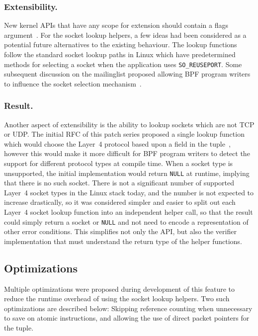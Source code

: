 \documentclass[10pt,sigconf,authorversion]{lpc}
\begin{document}
\subsubsection{Extensibility.}

New kernel APIs that have any scope for extension should contain a flags
argument~\cite{syscall-flags}. For the socket lookup helpers, a few ideas had
been considered as a potential future alternatives to the existing behaviour.
The lookup functions follow the standard socket lookup paths in Linux which
have predetermined methods for selecting a socket when the application uses
\verb+SO_REUSEPORT+. Some subsequent discussion on the mailinglist proposed
allowing BPF program writers to influence the socket selection
mechanism~\cite{netdev-sk-select}.

\subsubsection{Result.}

Another aspect of extensibility is the ability to lookup sockets which are not
TCP or UDP. The initial RFC of this patch series proposed a single lookup
function which would choose the Layer~4 protocol based upon a field in the
tuple~\cite{sk-lookup-rfc}, however this would make it more difficult for BPF
program writers to detect the support for different protocol types at compile
time. When a socket type is unsupported, the initial implementation would
return \verb+NULL+ at runtime, implying that there is no such socket. There is
not a significant number of supported Layer~4 socket types in the Linux stack
today, and the number is not expected to increase drastically, so it was
considered simpler and easier to split out each Layer~4 socket lookup function
into an independent helper call, so that the result could simply return a
socket or \verb+NULL+ and not need to encode a representation of other error
conditions. This simplifies not only the API, but also the verifier
implementation that must understand the return type of the helper functions.

\subsection{Optimizations}

Multiple optimizations were proposed during development of this feature to
reduce the runtime overhead of using the socket lookup helpers. Two such
optimizations are described below: Skipping reference counting when unnecessary
to save on atomic instructions, and allowing the use of direct packet pointers
for the tuple.
\end{document}
